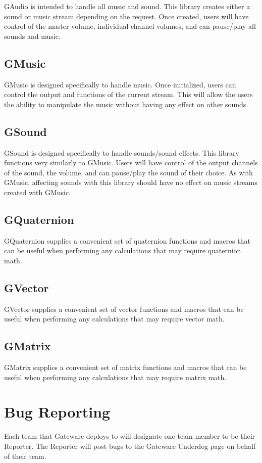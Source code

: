G\+Audio is intended to handle all music and sound. This library creates either a sound or music stream depending on the request. Once created, users will have control of the master volume, individual channel volumes, and can pause/play all sounds and music.\hypertarget{index_APIGMusic}{}\subsection{G\+Music}\label{index_APIGMusic}
G\+Music is designed specifically to handle music. Once initialized, users can control the output and functions of the current stream. This will allow the users the ability to manipulate the music without having any effect on other sounds.\hypertarget{index_APIGSound}{}\subsection{G\+Sound}\label{index_APIGSound}
G\+Sound is designed specifically to handle sounds/sound effects. This library functions very similarly to G\+Music. Users will have control of the output channels of the sound, the volume, and can pause/play the sound of their choice. As with G\+Music, affecting sounds with this library should have no effect on music streams created with G\+Music.\hypertarget{index_APIGQuaternion}{}\subsection{G\+Quaternion}\label{index_APIGQuaternion}
G\+Quaternion supplies a convenient set of quaternion functions and macros that can be useful when performing any calculations that may require quaternion math.\hypertarget{index_APIGVector}{}\subsection{G\+Vector}\label{index_APIGVector}
G\+Vector supplies a convenient set of vector functions and macros that can be useful when performing any calculations that may require vector math.\hypertarget{index_APIGMatrix}{}\subsection{G\+Matrix}\label{index_APIGMatrix}
G\+Matrix supplies a convenient set of matrix functions and macros that can be useful when performing any calculations that may require matrix math.\hypertarget{index_Reporting}{}\section{Bug Reporting}\label{index_Reporting}
Each team that Gateware deploys to will designate one team member to be their Reporter. The Reporter will post bugs to the Gateware Underdog page on behalf of their team. 
